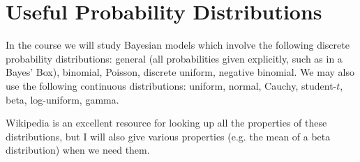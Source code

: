 \section{Useful Probability Distributions}
In the course we will study Bayesian models which involve the following
discrete probability distributions: general (all probabilities given explicitly,
such as in a Bayes' Box), binomial, Poisson, discrete uniform, negative binomial.
We may also use the following continuous distributions: uniform, normal,
Cauchy, student-$t$, beta, log-uniform, gamma.

Wikipedia is an excellent resource for looking up all the properties of these
distributions, but I will also give various properties (e.g. the mean of a beta
distribution) when we need them.


